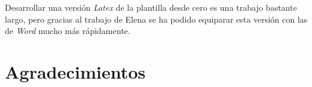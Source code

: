 \documentclass[11pt]{report}
\renewcommand{\chaptermark}[1]{\markboth{\scriptsize\MakeUppercase{#1}}{}}
\renewcommand{\sectionmark}[1]{\markright{\tiny\MakeUppercase{#1}}{}}
\renewcommand{\footrulewidth}{0.4pt}
\begin{document}
Desarrollar una versión \textit{Latex} de la plantilla desde cero es una trabajo bastante largo, pero gracias al trabajo de Elena se ha podido equiparar esta versión con las de \textit{Word} mucho más rápidamente.

\thispagestyle{empty}
\chapter*{Agradecimientos}


\pagestyle{fancy}
\renewcommand{\chaptermark}[1]{\markboth{\scriptsize\MakeUppercase{#1}}{}}
\renewcommand{\sectionmark}[1]{\markright{\tiny\MakeUppercase{#1}}{}}


\fancyfoot{}
\fancyfoot[R] {\thepage}
\renewcommand{\footrulewidth}{0.4pt}


\thispagestyle{empty}


\setcounter{tocdepth}{2}
\setcounter{secnumdepth}{4}
\pagestyle{empty}
{
  \renewcommand{\thispagestyle}[1]{}
  \tableofcontents
}
\clearpage


\newpage
{
  \renewcommand{\thispagestyle}[1]{}
  \listoffigures
}
\clearpage

\newpage
{
  \renewcommand{\thispagestyle}[1]{}
  \listoftables
}
\clearpage
















\newpage
\nocite{*} %
 


\newpage
\end{document}
